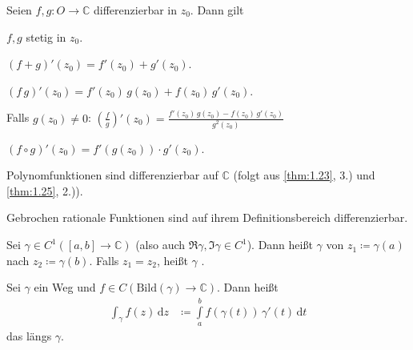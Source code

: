 \begin{theorem}[Satz] \label{thm:1.25}
  Seien $f,g : O \to \mathbb{C}$ differenzierbar in $z_0$.
  Dann gilt
  \begin{enum-arab}
    \item $f,g$ stetig in $z_0$.
    
    \item $(f+g)'(z_0) = f'(z_0) + g'(z_0)$.
    
    \item $(f \, g)'(z_0) = f'(z_0) \, g(z_0) + f(z_0) \, g'(z_0)$.
    
    \item Falls $g(z_0) \neq 0$: $\displaystyle \left( \frac{f}{g} \right)'(z_0) = \frac{f'(z_0) \, g(z_0) - f(z_0) \, g'(z_0)}{g^2(z_0)}$
    
    \item $(f \circ g)'(z_0) = f'(g(z_0)) \cdot g'(z_0)$.
  \end{enum-arab}
\end{theorem}

\begin{example}
  \begin{enum-arab}
    \item Polynomfunktionen sind differenzierbar auf $\mathbb{C}$ (folgt aus \ref{thm:1.23}, 3.) und \ref{thm:1.25}, 2.)).
    
    \item Gebrochen rationale Funktionen sind auf ihrem Definitionsbereich differenzierbar.
  \end{enum-arab}
\end{example}

\begin{theorem}[Definition]
  \begin{enum-arab}
    \item Sei $\gamma \in C^1([a,b] \to \mathbb{C})$ (also auch $\Re \gamma, \Im \gamma \in C^1$). Dann heißt $\gamma$  von $z_1 \coloneq \gamma(a)$ nach $z_2 \coloneq \gamma(b)$. Falls $z_1 = z_2$, heißt $\gamma$ .
    
    \item Sei $\gamma$ ein Weg und $f \in C(\mathrm{Bild}(\gamma) \to \mathbb{C})$. Dann heißt
    \begin{align*}
      \int_\gamma f(z) \, \mathrm{d}z &\coloneq \int\limits_{a}^{b} f(\gamma(t)) \, \gamma'(t) \, \mathrm{d}t 
    \end{align*}
    das  längs $\gamma$.
  \end{enum-arab}
\end{theorem}

